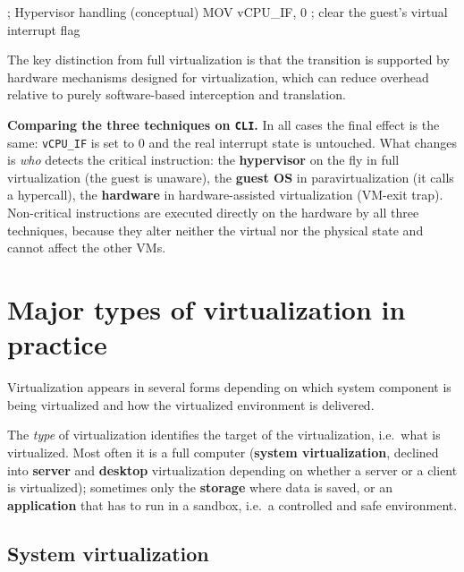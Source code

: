 \begin{codeblock}
; Hypervisor handling (conceptual)
MOV vCPU_IF, 0   ; clear the guest's virtual interrupt flag
\end{codeblock}

The key distinction from full virtualization is that the transition is supported by hardware mechanisms designed for virtualization, which can reduce overhead relative to purely software-based interception and translation.

\begin{notebox}
	\textbf{Comparing the three techniques on \texttt{CLI}.} In all cases the final effect is the same: \texttt{vCPU\_IF} is set to 0 and the real interrupt state is untouched. What changes is \emph{who} detects the critical instruction: the \textbf{hypervisor} on the fly in full virtualization (the guest is unaware), the \textbf{guest OS} in paravirtualization (it calls a hypercall), the \textbf{hardware} in hardware-assisted virtualization (VM-exit trap). Non-critical instructions are executed directly on the hardware by all three techniques, because they alter neither the virtual nor the physical state and cannot affect the other VMs.
\end{notebox}

\begin{center}
\end{center}


\section{Major types of virtualization in practice}

Virtualization appears in several forms depending on which system component is being virtualized and how the virtualized environment is delivered.

The \emph{type} of virtualization identifies the target of the virtualization, i.e.\ what is virtualized. Most often it is a full computer (\textbf{system virtualization}, declined into \textbf{server} and \textbf{desktop} virtualization depending on whether a server or a client is virtualized); sometimes only the \textbf{storage} where data is saved, or an \textbf{application} that has to run in a sandbox, i.e.\ a controlled and safe environment.

\subsection{System virtualization}

